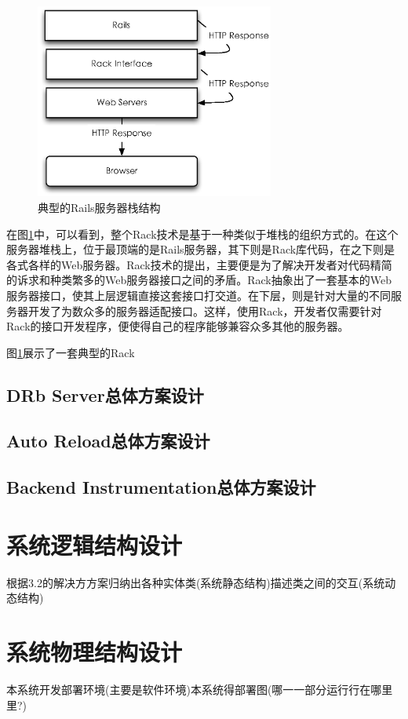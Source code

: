 \begin{figure}[h]
\centering
\includegraphics[width=0.7\textwidth]{images/overview/rack.eps}
\caption{典型的Rails服务器栈结构}
\label{fig-server-stack}
\end{figure}

在图\ref{fig-server-stack}中，可以看到，整个Rack技术是基于一种类似于堆栈的组织方式的。在这个服务器堆栈上，位于最顶端的是Rails服务器，其下则是Rack库代码，在之下则是各式各样的Web服务器。Rack技术的提出，主要便是为了解决开发者对代码精简的诉求和种类繁多的Web服务器接口之间的矛盾。Rack抽象出了一套基本的Web服务器接口，使其上层逻辑直接这套接口打交道。在下层，则是针对大量的不同服务器开发了为数众多的服务器适配接口。这样，使用Rack，开发者仅需要针对Rack的接口开发程序，便使得自己的程序能够兼容众多其他的服务器。

图\ref{fig-server-stack}展示了一套典型的Rack


\subsection{DRb Server总体方案设计}

\subsection{Auto Reload总体方案设计}

\subsection{Backend Instrumentation总体方案设计}

\section{系统逻辑结构设计}
根据3.2的解决⽅方案归纳出各种实体类(系统静态结构)描述类之间的交互(系统动态结构)

\section{系统物理结构设计}
本系统开发部署环境(主要是软件环境)本系统得部署图(哪⼀一部分运⾏行在哪⾥里?)